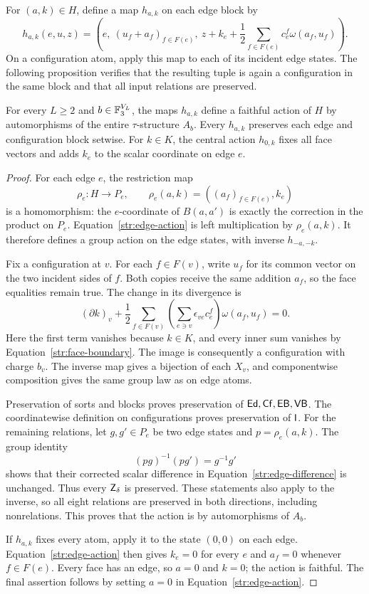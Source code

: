 For $(a,k)\in H$, define a map $h_{a,k}$ on each edge block by
\begin{equation}\label{str:edge-action}
 h_{a,k}(e,u,z)=
 \left(e,\ (u_f+a_f)_{f\in F(e)},\
 z+k_e+\frac12\sum_{f\in F(e)}c^f_e\omega(a_f,u_f)\right).
\end{equation}
On a configuration atom, apply this map to each of its incident edge
states.  The following proposition verifies that the resulting tuple is
again a configuration in the same block and that all input relations are
preserved.

\begin{proposition}\label{str:action}
For every $L\ge2$ and $b\in\mathbb F_3^{V_L}$, the maps $h_{a,k}$ define a faithful
action of $H$ by automorphisms of the entire $\tau$-structure $A_b$.
Every $h_{a,k}$ preserves each edge and configuration block setwise.
For $k\in K$, the central action $h_{0,k}$ fixes all face vectors and adds
$k_e$ to the scalar coordinate on edge $e$.
\end{proposition}
\begin{proof}
For each edge $e$, the restriction map
\[
 \rho_e:H\longrightarrow P_e,
 \qquad \rho_e(a,k)=((a_f)_{f\in F(e)},k_e)
\]
is a homomorphism: the $e$-coordinate of $B(a,a')$ is exactly the
correction in the product on $P_e$.  Equation~\eqref{str:edge-action} is
left multiplication by $\rho_e(a,k)$.  It therefore defines a group
action on the edge states, with inverse $h_{-a,-k}$.

Fix a configuration at $v$.  For each $f\in F(v)$, write $u_f$ for its
common vector on the two incident sides of $f$.  Both copies receive the
same addition $a_f$, so the face equalities remain true.  The change in
its divergence is
\[
 (\partial k)_v+
 \frac12\sum_{f\in F(v)}
 \left(\sum_{e\ni v}\epsilon_{ve}c^f_e\right)\omega(a_f,u_f)=0.
\]
Here the first term vanishes because $k\in K$, and every inner sum
vanishes by Equation~\eqref{str:face-boundary}.  The image is consequently
a configuration with charge $b_v$.  The inverse map gives a bijection
of each $X_v$, and componentwise composition gives the same group law
as on edge atoms.

Preservation of sorts and blocks proves preservation of
$\mathsf{Ed},\mathsf{Cf},\mathsf{EB},\mathsf{VB}$.  The coordinatewise definition on configurations
proves preservation of $\mathsf I$.  For the remaining relations, let
$g,g'\in P_e$ be two edge states and $p=\rho_e(a,k)$.  The group identity
\[
 (pg)^{-1}(pg')=g^{-1}g'
\]
shows that their corrected scalar difference in
Equation~\eqref{str:edge-difference} is unchanged.  Thus every
$\mathsf Z_\delta$ is preserved.  These statements also apply to the inverse,
so all eight relations are preserved in both directions, including
nonrelations.  This proves that the action is by automorphisms of $A_b$.

If $h_{a,k}$ fixes every atom, apply it to the state $(0,0)$ on each edge.
Equation~\eqref{str:edge-action} then gives $k_e=0$ for every $e$ and
$a_f=0$ whenever $f\in F(e)$.  Every face has an edge, so $a=0$ and $k=0$;
the action is faithful.  The final assertion follows by setting $a=0$
in Equation~\eqref{str:edge-action}.
\end{proof}

